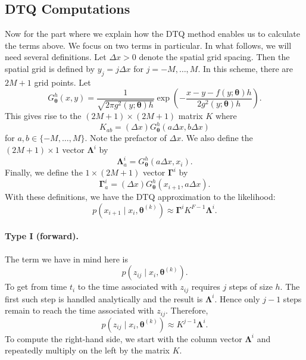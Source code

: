 \documentclass[12pt]{article}
\newcommand{\btheta}{\ensuremath{\boldsymbol{\theta}}}
\newcommand{\bLambda}{\ensuremath{\boldsymbol{\Lambda}}}
\newcommand{\bGamma}{\ensuremath{\boldsymbol{\Gamma}}}
\begin{document}
\subsection{DTQ Computations}
Now for the part where we explain how the DTQ method enables us to calculate the terms above.  We focus on two terms in particular.  In what follows, we will need several definitions.  Let $\Delta x > 0$ denote the spatial grid spacing. Then the spatial grid is defined by $y_j = j \Delta x$ for $j = -M, \ldots, M$.  In this scheme, there are $2M+1$ grid points.  Let
$$
G^h_{\btheta}(x,y) = \frac{1}{\sqrt{2 \pi g^2(y; \btheta) h}} \exp \left( -\frac{ x - y - f(y;\btheta) h}{2 g^2(y; \btheta) h} \right).
$$
This gives rise to the $(2M+1) \times (2M+1)$ matrix $K$ where
$$
K_{ab} = (\Delta x) G^h_{\btheta}(a \Delta x, b \Delta x)
$$
for $a, b \in \{-M, \ldots, M\}$.  Note the prefactor of $\Delta x$.  We also define the $(2M+1) \times 1$ vector $\bLambda^i$ by 
$$
\bLambda^i_a = G^h_{\btheta}(a \Delta x, x_i).
$$
Finally, we define the $1 \times (2M+1)$ vector $\bGamma^i$ by
$$
\bGamma^i_a = (\Delta x) G^h_{\btheta}( x_{i+1}, a \Delta x ).
$$
With these definitions, we have the DTQ approximation to the likelihood:
$$
p(x_{i+1} \mid x_i, \btheta^{(k)}) \approx \bGamma^i K^{F-1} \bLambda^i.
$$

\paragraph{Type I (forward).} The term we have in mind here is
$$
p(z_{ij} \mid x_i, \btheta^{(k)}).
$$
To get from time $t_i$ to the time associated with $z_{ij}$ requires $j$ steps of size $h$.  The first such step is handled analytically and the result is $\bLambda^i$.  Hence only $j-1$ steps remain to reach the time associated with $z_{ij}$.  Therefore,
$$
p(z_{ij} \mid x_i, \btheta^{(k)}) \approx K^{j-1} \bLambda^i.
$$
To compute the right-hand side, we start with the column vector $\bLambda^i$ and repeatedly multiply on the left by the matrix $K$.
\end{document}
